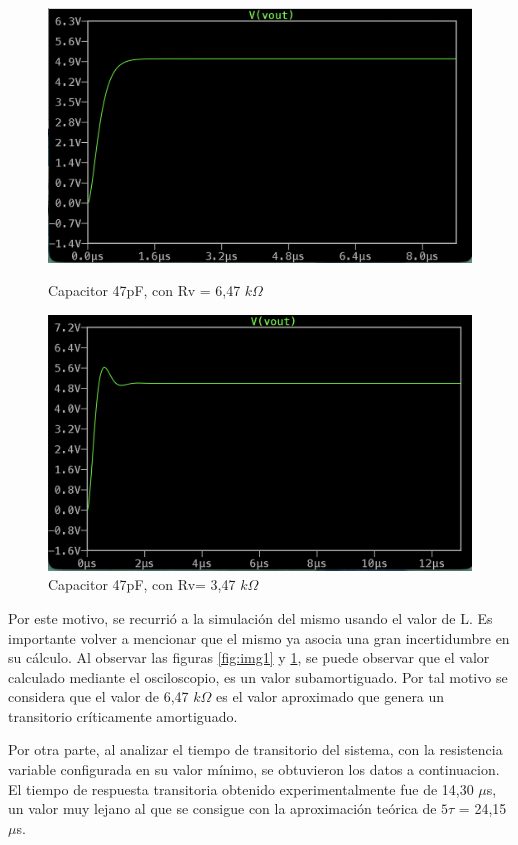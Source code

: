 \documentclass{article}
\begin{document}
        \begin{figure}[h]
    \centering
    \begin{minipage}{0.49\textwidth}
        \centering
        \includegraphics[width=\linewidth]{CRIT2.png}
        \caption{Capacitor 47pF, con Rv = 6,47 $k\Omega$}
        \label{fig:img1}
    \end{minipage}\hfill
    \begin{minipage}{0.49\textwidth}
        \centering
        \includegraphics[width=\linewidth]{SUBAMORT1.png}
        \caption{Capacitor 47pF, con Rv= 3,47 $k\Omega$}
        \label{fig:img2}
    \end{minipage}
\end{figure}

        Por este motivo, se recurrió a la simulación del mismo usando el valor de L. Es importante volver a mencionar que el mismo ya asocia una gran incertidumbre en su cálculo. Al observar las figuras \ref{fig:img1} y \ref{fig:img2}, se puede observar que el valor calculado mediante el osciloscopio, es un valor subamortiguado. Por tal motivo se considera que el valor de 6,47 $k\Omega$ es el valor aproximado que genera un transitorio críticamente amortiguado.\par
        Por otra parte, al analizar el tiempo de transitorio del sistema, con la resistencia variable configurada en su valor mínimo, se obtuvieron los datos a continuacion. El tiempo de respuesta transitoria obtenido experimentalmente fue de 14,30 $\mu$s, un valor muy lejano al que se consigue con la aproximación teórica de $5\tau$ = 24,15 $\mu$s. \par
        
\end{document}
